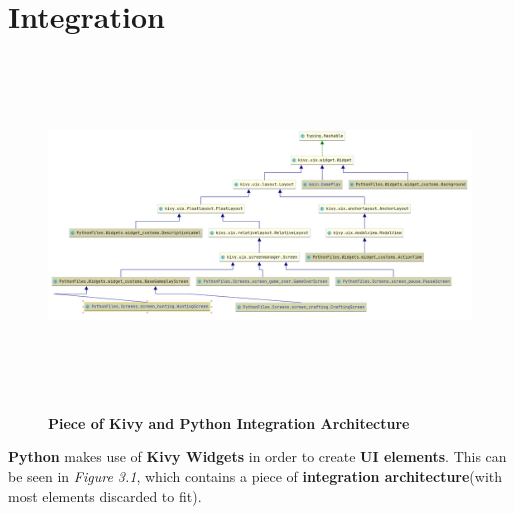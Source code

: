 	\section{Integration}
		\begin{figure}[H]
			\centering
			\includegraphics[width=14cm, height=9cm, keepaspectratio]{Images/Diagram.png}\\
			\caption{\textbf{Piece of Kivy and Python Integration Architecture}}
		\end{figure}
		\par \textbf{Python} makes use of \textbf{Kivy Widgets} in order to create \textbf{UI elements}. This can be seen in \textit{Figure 3.1}, which contains a piece of \textbf{integration architecture}(with most elements discarded to fit).
	

